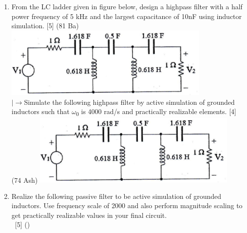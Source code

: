\documentclass[12pt]{article}
\newcommand{\w}{\(\omega\)}
\newcommand{\lb}{\\$\left|\rightarrow\right.$}
\newcommand{\enter}{\\\textcolor{white}{1}}
\newcommand{\sub}[1]{\textsubscript{#1}}
\begin{document}
\begin{enumerate}[topsep=0pt]
				\item From the LC ladder given in figure below, design a highpass filter with a half power frequency of 5 kHz and the largest capacitance of 10nF using inductor simulation. \hfill [5] (81 Ba)\\
				\includegraphics[width=4in]{./pics/fd_11}
				\lb Simulate the following highpass filter by active simulation of grounded inductors such that \w\sub{0} is 4000 rad/s and practically realizable elements. \hfill [4] (74 Ash)
				\includegraphics[width=4in]{./pics/fd_11}

				\item Realize the following passive filter to be active simulation of grounded inductors. Use frequency scale of 2000 and also perform magnitude scaling to get practically realizable values in your final circuit.
				\enter\hfill [5] ()
			\end{enumerate}
	
\end{document}
